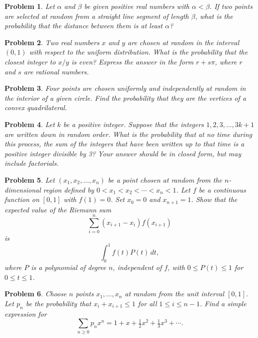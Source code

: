 \documentclass[12pt]{article}
\newtheorem{problem}{Problem}
\begin{document}
\begin{problem}
Let $\alpha$ and $\beta$ be given positive real numbers with $\alpha < \beta$. If two points are selected at random
from a straight line segment of length $\beta$, what is the probability that the distance between
them is at least $\alpha$?
\end{problem}

\begin{problem}
Two real numbers $x$ and $y$ are chosen at random in the interval $(0,1)$ with respect to the
uniform distribution. What is the probability that the closest integer to $x/y$ is even? Express
the answer in the form $r + s\pi$, where $r$ and $s$ are rational numbers.
\end{problem}

\begin{problem}
Four points are chosen uniformly and independently at random in the interior of a given
circle. Find the probability that they are the vertices of a convex quadrilateral.
\end{problem}

\begin{problem}
Let $k$ be a positive integer. Suppose that the integers $1,2,3,\dots,3k+1$ are written down in
random order. What is the probability that at no time during this process, the sum of the
integers that have been written up to that time is a positive integer divisible by 3? Your
answer should be in closed form, but may include factorials.
\end{problem}

\begin{problem}
Let $(x_1, x_2, \dots, x_n)$ be a point chosen at random from the $n$-dimensional region defined by
$0 < x_1 < x_2 < \cdots < x_n < 1$. Let $f$ be a continuous function on $[0,1]$ with $f(1)=0$. Set
$x_0 = 0$ and $x_{n+1} = 1$. Show that the expected value of the Riemann sum
\[
\sum_{i=0}^n (x_{i+1}-x_i) f(x_{i+1})
\]
is
\[
\int_0^1 f(t)P(t)\, dt,
\]
where $P$ is a polynomial of degree $n$, independent of $f$, with $0 \leq P(t) \leq 1$ for $0 \leq t \leq 1$.
\end{problem}

\begin{problem}
Choose $n$ points $x_1, \dots, x_n$ at random from the unit interval $[0,1]$. Let $p_n$ be the probability
that $x_i+x_{i+1} \leq 1$ for all $1 \leq i \leq n-1$. Find a simple expression for
\[
\sum_{n \geq 0} p_n x^n = 1 + x + \tfrac{1}{2}x^2 + \tfrac{1}{3}x^3 + \cdots.
\]
\end{problem}
\end{document}
